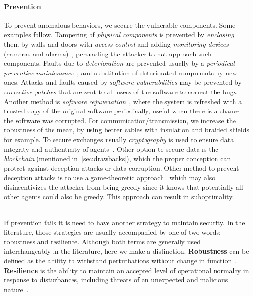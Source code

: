 \documentclass[../main.tex]{subfiles}
\begin{document}
\paragraph{Prevention} To prevent anomalous behaviors, we secure the vulnerable components.
Some examples follow.
Tampering of \emph{physical components} is prevented by \emph{enclosing} them by walls and doors with \emph{access control} and adding \emph{monitoring devices} (cameras and alarms)~\cite{CardenasEtAl2008,DingEtAl2018}, persuading the attacker to not approach such components.
Faults due to \emph{deterioration} are prevented usually by a \emph{periodical preventive maintenance}~\cite{ChenEtAl2021}, and substitution of deteriorated components by new ones.
Attacks and faults caused by \emph{software vulnerabilities} may be prevented by \emph{corrective patches} that are sent to all users of the software to correct the bugs.
Another method is \emph{software rejuvenation}~\cite{AlonsoEtAl2012,GriffioenEtAl2020}, where the system is refreshed with a trusted copy of the original software periodically, useful when there is a chance the software was corrupted.
For communication/transmission, we increase the robustness of the mean, by using better cables with insulation and braided shields for example.
To secure exchanges usually \emph{cryptography} is used to ensure data integrity and authenticity of agents~\cite{DingEtAl2018}. Other option to secure data is the
\emph{blockchain} (mentioned in~\ref{sec:drawbacks}), which the proper conception can protect against deception attacks or data corruption.
Other method to prevent deception attacks is to use a game-theoretic approach~\cite{MaestreEtAl2011,ZhuMartinez2011} which may also disincentivizes the attacker from being greedy since it knows that potentially all other agents could also be greedy. This approach can result in suboptimality.

~\\If prevention fails it is need to have another strategy to maintain security.
In the literature, those strategies are usually accompanied by one of two words: robustness and resilience.
Although both terms are generally used interchangeably in the literature, here we make a distinction.
\textbf{Robustness} can be defined as the ability to withstand perturbations without change in function~\cite{Jen2003}. \textbf{Resilience} is the ability to maintain an accepted level of operational normalcy in  response  to  disturbances,  including  threats  of  an unexpected and malicious nature~\cite{Rieger2010}.
\end{document}
